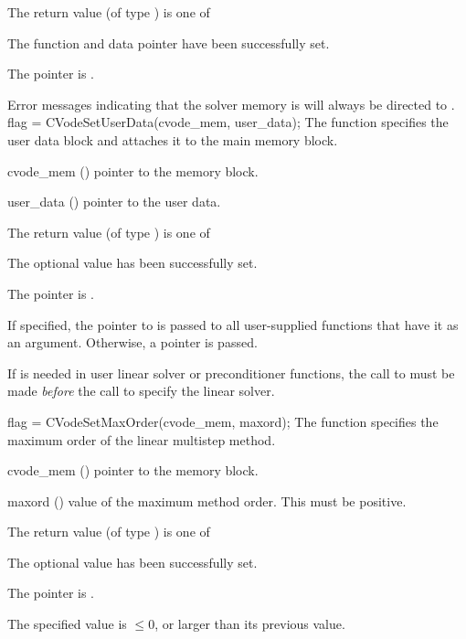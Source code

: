 {
  The return value  (of type ) is one of
  \begin{args}
  \item[\Id{CV\_SUCCESS}]
    The function  and data pointer  have been successfully set.
  \item[\Id{CV\_MEM\_NULL}]
    The  pointer is .
  \end{args}
}
{
  Error messages indicating that the {\cvode} solver memory is  will
  always be directed to .
}
{
  flag = CVodeSetUserData(cvode\_mem, user\_data);
}
{
  The function  specifies the user data block 
  and attaches it to the main {\cvode} memory block.
}
{
  \begin{args}
  \item[cvode\_mem] ()
    pointer to the {\cvode} memory block.
  \item[user\_data] ()
    pointer to the user data.
  \end{args}
}
{
  The return value  (of type ) is one of
  \begin{args}
  \item[\Id{CV\_SUCCESS}]
    The optional value has been successfully set.
  \item[\Id{CV\_MEM\_NULL}]
    The  pointer is .
  \end{args}
}
{
  If specified, the pointer to  is passed to all user-supplied
  functions that have it as an argument. Otherwise, a  pointer is passed.

  {\warn}If  is needed in user linear solver or preconditioner
   functions, the call to  must be made {\it before} the
   call to specify the linear solver.
}
{
flag = CVodeSetMaxOrder(cvode\_mem, maxord);
}
{
  The function  specifies the maximum order of the
  linear multistep method.
}
{
  \begin{args}
  \item[cvode\_mem] ()
    pointer to the {\cvode} memory block.
  \item[maxord] ()
    value of the maximum method order.  This must be positive.
  \end{args}
}
{
  The return value  (of type ) is one of
  \begin{args}
  \item[\Id{CV\_SUCCESS}]
    The optional value has been successfully set.
  \item[\Id{CV\_MEM\_NULL}]
    The  pointer is .
  \item[\Id{CV\_ILL\_INPUT}]
    The specified value  is $\leq 0$, or larger than
    its previous value.
  \end{args}
}
